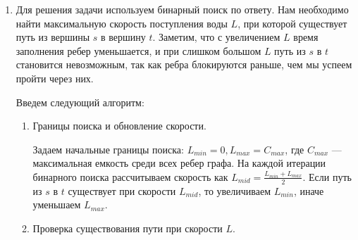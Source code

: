 \begin{enumerate}
\begin{enumerate}
        \item Бесплатное ребро. Переходим в вершину с тем же состоянием пропуска и стоимостью пути.
        \item Платное ребро. Если у нас есть пропуск соответствующего типа, то переходим в вершину с новым состоянием пропуска и стоимостью пути.
        \item Покупка пропуска. Если у нас нет пропуска, то покупаем его и откладываем событие в очередь из той же вершины с новым состоянием пропуска и стоимостью пути увеличенной на $A$.
        \item Продажа пропуска. Если у нас есть какой-то другой пропуск, то продаем его и откладываем событие в очередь из той же вершины с новым состоянием пропуска и стоимостью пути уменьшенной на $B$.

        \end{enumerate}

        Обрабатывая, каждую вершину мы проверяем, что она минимизует стоимость пути до нее.
        После завершения поиска в глубину, находим минимальную из стоимостей путей до вершины $t$.
        Так как мы увеличили количество вершин и ребер в $K$ раз, то сложность алгоритма --- $\O(K(V + E))$.

    \item

        Для решения задачи используем бинарный поиск по ответу. Нам необходимо найти максимальную скорость поступления воды
        $L$, при которой существует путь из вершины $s$ в вершину $t$. Заметим, что с увеличением $L$ время заполнения ребер
        уменьшается, и при слишком большом $L$ путь из $s$ в $t$ становится невозможным, так как ребра блокируются
        раньше, чем мы успеем пройти через них.

        Введем следующий алгоритм:

        \begin{enumerate}

        \item Границы поиска и обновление скорости.

        Задаем начальные границы поиска: $L_{min} = 0, L_{max} = C_{max}$, где $C_{max}$ --- максимальная емкость среди всех ребер графа.
        На каждой итерации бинарного поиска рассчитываем скорость как $L_{mid} = \frac{L_{min} + L_{max}}{2}$.
        Если путь из $s$ в $t$ существует при скорости $L_{mid}$, то увеличиваем $L_{min}$, иначе уменьшаем $L_{max}$.

        \item Проверка существования пути при скорости $L$.


\end{enumerate}
\end{enumerate}
